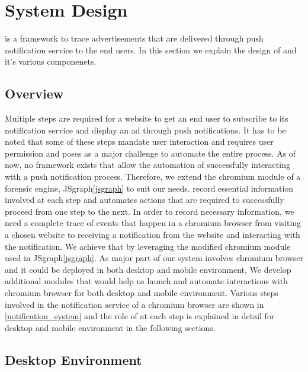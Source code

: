 \section{System Design}
\sysname is a framework to trace advertisements that are delivered through push notification service to the end users. In this section we explain the design of \sysname and it's various componenets.

\subsection{Overview}
Multiple steps are required for a website to get an end user to subscribe to its notification service and display an ad through push notifications. It has to be noted that some of these steps mandate user interaction and requires user permission and poses as a major challenge to automate the entire process. As of now, no framework exists that allow the automation of successfully interacting with a push notification process. Therefore, we extend the chromium module of a forensic engine, JSgraph\ref{jsgraph} to suit our needs. \sysname record essential information involved at each step and automates actions that are required to successfully proceed from one step to the next. In order to record necessary information, we need a complete trace of events that happen in a chromium browser from visiting a chosen website to receiving a notification from the website and interacting with the notification. We achieve that by leveraging the modified chromium module used in JSgraph\ref{jsgraph}. As major part of our system involves chromium browser and it could be deployed in both desktop and mobile environment, We develop additional modules that would help us launch and automate interactions with chromium browser for both desktop and mobile environment. Various steps involved in the notification service of a chromium browser are shown in \ref{notification_system} and the role of \sysname at each step is explained in detail for desktop and mobile environment in the following sections.


\subsection{Desktop Environment}

